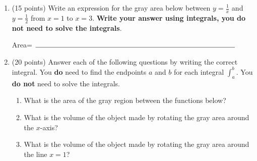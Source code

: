\documentclass[11pt]{article}
\begin{document}
\begin{enumerate}
\vspace{70pt}


\item (15 points) Write an expression for the gray area below between $y=\frac{1}{x}$ and $y=\frac{1}{2}$ from $x=1$ to $x=3$. \textbf{Write your answer using integrals, you do not need to solve the integrals}.

\begin{center}
\end{center}

\vspace{20pt}

\begin{center}
Area= $\rule{10cm}{0.4pt}$
\end{center}

\newpage

\item (20 points) Answer each of the following questions by writing the correct integral. You \textbf{do} need to find the endpoints $a$ and $b$ for each integral $\int_{a}^{b}$.  You \textbf{do not} need to solve the integrals.

\begin{enumerate}[itemsep=70pt]
    \item What is the area of the gray region between the functions below?
    \item What is the volume of the object made by rotating the gray area around the $x$-axis?
    \item What is the volume of the object made by rotating the gray area around the line $x=1$?
\end{enumerate}


\end{enumerate}
\end{document}

